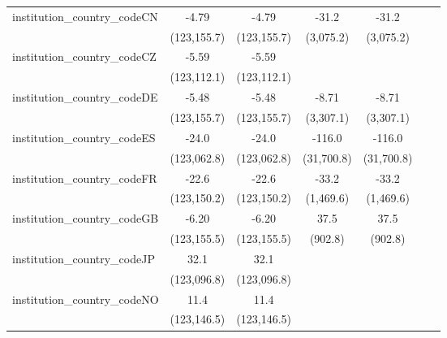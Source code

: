 \begin{tabular}{lcccccc}
   institution\_country\_codeCN          & -4.79        & -4.79        & -31.2        & -31.2        &             &   \\   
                                         & (123,155.7)  & (123,155.7)  & (3,075.2)    & (3,075.2)    &             &   \\   
   institution\_country\_codeCZ          & -5.59        & -5.59        &              &              &             &   \\   
                                         & (123,112.1)  & (123,112.1)  &              &              &             &   \\   
   institution\_country\_codeDE          & -5.48        & -5.48        & -8.71        & -8.71        &             &   \\   
                                         & (123,155.7)  & (123,155.7)  & (3,307.1)    & (3,307.1)    &             &   \\   
   institution\_country\_codeES          & -24.0        & -24.0        & -116.0       & -116.0       &             &   \\   
                                         & (123,062.8)  & (123,062.8)  & (31,700.8)   & (31,700.8)   &             &   \\   
   institution\_country\_codeFR          & -22.6        & -22.6        & -33.2        & -33.2        &             &   \\   
                                         & (123,150.2)  & (123,150.2)  & (1,469.6)    & (1,469.6)    &             &   \\   
   institution\_country\_codeGB          & -6.20        & -6.20        & 37.5         & 37.5         &             &   \\   
                                         & (123,155.5)  & (123,155.5)  & (902.8)      & (902.8)      &             &   \\   
   institution\_country\_codeJP          & 32.1         & 32.1         &              &              &             &   \\   
                                         & (123,096.8)  & (123,096.8)  &              &              &             &   \\   
   institution\_country\_codeNO          & 11.4         & 11.4         &              &              &             &   \\   
                                         & (123,146.5)  & (123,146.5)  &              &              &             &   \\   

\end{tabular}

